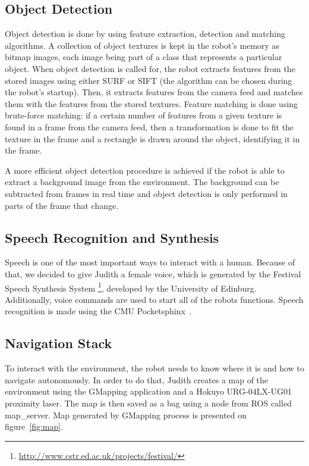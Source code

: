 \subsection{Object Detection}\label{object-detection}
Object detection is done by using feature extraction, detection and matching algorithms. A collection of object textures is kept in the robot's memory as bitmap images, each image being part of a class that represents a particular object. When object detection is called for, the robot extracts features from the stored images using either SURF \cite{bay_speeded-up_2008} or SIFT \cite{lowe_object_1999} (the algorithm can be chosen during the robot's startup). Then, it extracts features from the camera feed and matches them with the features from the stored textures. Feature matching is done using brute-force matching: if a certain number of features from a given texture is found in a frame from the camera feed, then a transformation is done to fit the texture in the frame and a rectangle is drawn around the object, identifying it in the frame.

A more efficient object detection procedure is achieved if the robot is able to extract a background image from the environment. The background can be subtracted from frames in real time and object detection is only performed in parts of the frame that change.

\subsection{Speech Recognition and Synthesis}\label{speech}
Speech is one of the most important ways to interact with a human. Because of that, we decided to give Judith a female voice, which is generated by the Festival Speech Synthesis System \footnote{\url{http://www.cstr.ed.ac.uk/projects/festival/}}, developed by the University of Edinburg. Additionally, voice commands are used to start all of the robots functions. Speech recognition is made using the CMU Pocketsphinx~\cite{huggins:2006}.

\subsection{Navigation Stack}\label{navigation}
To interact with the environment, the robot needs to know where it is and how to navigate autonomously. In order to do that, Judith creates a map of the environment using the GMapping application and a Hokuyo URG-04LX-UG01 proximity laser. The map is then saved as a bag using a node from ROS called map\_server. Map generated by GMapping process is presented on figure~\ref{fig:map}.


